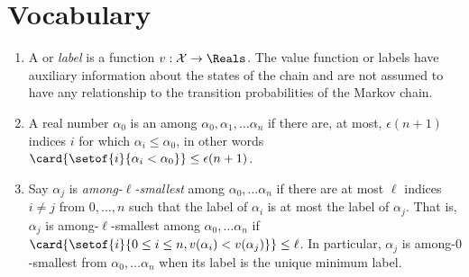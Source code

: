 \documentclass[12pt]{article}
\begin{document}
\hr

\section*{Vocabulary}
\begin{enumerate}
    \item
        A  or \emph{label} is a function \( v :
        \mathcal{X} \to \Reals \).  The value function or labels have
        auxiliary information about the states of the chain and are not
        assumed to have any relationship to the transition probabilities
        of the Markov chain.
    \item
        A real number \( \alpha_0 \) is an 
        among \( \alpha_0, \alpha_1, \dots \alpha_n \) if there are, at
        most, \( \epsilon(n + 1) \) indices \( i \) for which \( \alpha_i
        \le \alpha_0 \), in other words \( \card{ \setof{i}{\alpha_i <
        \alpha_0}} \le \epsilon(n+1) \).
    \item
        Say \( \alpha_j \) is \emph{among-\( \ell \)-smallest} among \(
        \alpha_0, \dots \alpha_n \) if there are at most \( \ell \)
        indices \( i \ne j \) from \( 0, \dots, n \) such that the label
        of \( \alpha_i \) is at most the label of \( \alpha_j \).  That
        is, \( \alpha_j \) is among-\( \ell \)-smallest among \( \alpha_0,
        \dots \alpha_n \) if \( \card{ \setof{i}{0 \le i \le n, v(\alpha_i)
        < v(\alpha_j)}} \le \ell \).  In particular, \( \alpha_j \) is
        among-\( 0 \)-smallest from \( \alpha_0, \dots \alpha_n \) when
        its label is the unique minimum label.
\end{enumerate}

\hr
\end{document}
